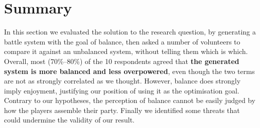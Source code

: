 \section{Summary}

In this section we evaluated the solution to the research question, by generating a battle system with the goal of balance, then asked a number of volunteers to compare it against an unbalanced system, without telling them which is which. Overall, most (70\%--80\%) of the 10 respondents agreed that \textbf{the generated system is more balanced and less overpowered}, even though the two terms are not as strongly correlated as we thought. However, balance does strongly imply enjoyment, justifying our position of using it as the optimisation goal. Contrary to our hypotheses, the perception of balance cannot be easily judged by how the players assemble their party. Finally we identified some threats that could undermine the validity of our result.